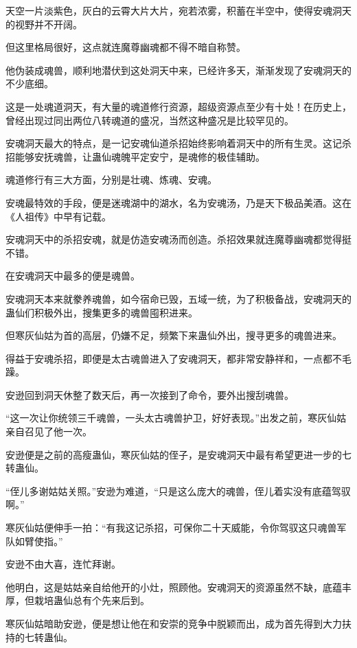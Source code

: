 
\begin{this_body}



天空一片淡紫色，灰白的云霄大片大片，宛若浓雾，积蓄在半空中，使得安魂洞天的视野并不开阔。

但这里格局很好，这点就连魔尊幽魂都不得不暗自称赞。

他伪装成魂兽，顺利地潜伏到这处洞天中来，已经许多天，渐渐发现了安魂洞天的不少底细。

这是一处魂道洞天，有大量的魂道修行资源，超级资源点至少有十处！在历史上，曾经出现过同出两位八转魂道的盛况，当然这种盛况是比较罕见的。

安魂洞天最大的特点，是一记安魂仙道杀招始终影响着洞天中的所有生灵。这记杀招能够安抚魂兽，让蛊仙魂魄平定安宁，是魂修的极佳辅助。

魂道修行有三大方面，分别是壮魂、炼魂、安魂。

安魂最特效的手段，便是迷魂湖中的湖水，名为安魂汤，乃是天下极品美酒。这在《人祖传》中早有记载。

安魂洞天中的杀招安魂，就是仿造安魂汤而创造。杀招效果就连魔尊幽魂都觉得挺不错。

在安魂洞天中最多的便是魂兽。

安魂洞天本来就豢养魂兽，如今宿命已毁，五域一统，为了积极备战，安魂洞天的蛊仙们积极外出，搜集更多的魂兽囤积进来。

但寒灰仙姑为首的高层，仍嫌不足，频繁下来蛊仙外出，搜寻更多的魂兽进来。

得益于安魂杀招，即便是太古魂兽进入了安魂洞天，都非常安静祥和，一点都不毛躁。

安逊回到洞天休整了数天后，再一次接到了命令，要外出搜刮魂兽。

“这一次让你统领三千魂兽，一头太古魂兽护卫，好好表现。”出发之前，寒灰仙姑亲自召见了他一次。

安逊便是之前的高瘦蛊仙，寒灰仙姑的侄子，是安魂洞天中最有希望更进一步的七转蛊仙。

“侄儿多谢姑姑关照。”安逊为难道，“只是这么庞大的魂兽，侄儿着实没有底蕴驾驭啊。”

寒灰仙姑便伸手一拍：“有我这记杀招，可保你二十天威能，令你驾驭这只魂兽军队如臂使指。”

安逊不由大喜，连忙拜谢。

他明白，这是姑姑亲自给他开的小灶，照顾他。安魂洞天的资源虽然不缺，底蕴丰厚，但栽培蛊仙总有个先来后到。

寒灰仙姑暗助安逊，便是想让他在和安崇的竞争中脱颖而出，成为首先得到大力扶持的七转蛊仙。


\end{this_body}
